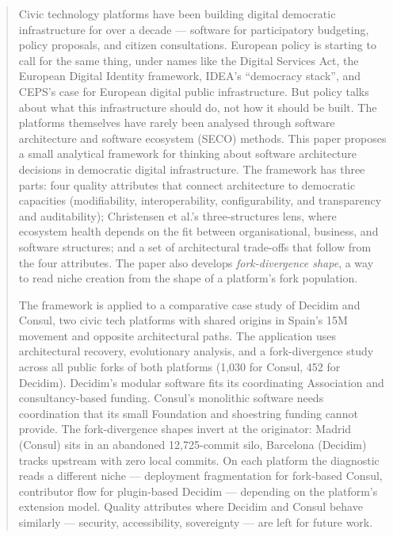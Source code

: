 \documentclass[11pt,a4paper]{article}
\begin{document}
\begin{abstract}
Civic technology platforms have been building digital democratic infrastructure for over a decade --- software for participatory budgeting, policy proposals, and citizen consultations. European policy is starting to call for the same thing, under names like the Digital Services Act, the European Digital Identity framework, IDEA's ``democracy stack'', and CEPS's case for European digital public infrastructure. But policy talks about what this infrastructure should do, not how it should be built. The platforms themselves have rarely been analysed through software architecture and software ecosystem (SECO) methods. This paper proposes a small analytical framework for thinking about software architecture decisions in democratic digital infrastructure. The framework has three parts: four quality attributes that connect architecture to democratic capacities (modifiability, interoperability, configurability, and transparency and auditability); Christensen et al.'s three-structures lens, where ecosystem health depends on the fit between organisational, business, and software structures; and a set of architectural trade-offs that follow from the four attributes. The paper also develops \emph{fork-divergence shape}, a way to read niche creation from the shape of a platform's fork population.

The framework is applied to a comparative case study of Decidim and Consul, two civic tech platforms with shared origins in Spain's 15M movement and opposite architectural paths. The application uses architectural recovery, evolutionary analysis, and a fork-divergence study across all public forks of both platforms (1{,}030 for Consul, 452 for Decidim). Decidim's modular software fits its coordinating Association and consultancy-based funding. Consul's monolithic software needs coordination that its small Foundation and shoestring funding cannot provide. The fork-divergence shapes invert at the originator: Madrid (Consul) sits in an abandoned 12{,}725-commit silo, Barcelona (Decidim) tracks upstream with zero local commits. On each platform the diagnostic reads a different niche --- deployment fragmentation for fork-based Consul, contributor flow for plugin-based Decidim --- depending on the platform's extension model. Quality attributes where Decidim and Consul behave similarly --- security, accessibility, sovereignty --- are left for future work.
\end{abstract}
\end{document}
